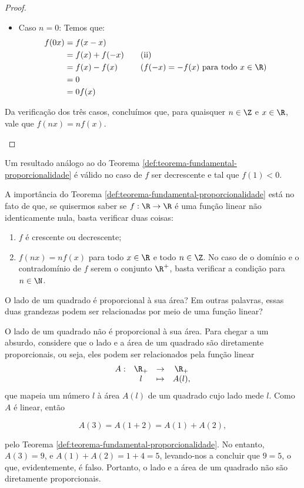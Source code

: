 \begin{proof}
\begin{itemize}
\begin{itemize}
      \item Caso $n=0$: Temos que:
      \begin{alignat*}{3}
        f(0x) &= f(x-x) \\
        &= f(x)+f(-x) && \quad\text{(ii)}\\
        &= f(x)-f(x) && \quad\text{($f(-x) = -f(x)$ para todo $x \in \R$)}\\
        &= 0\\
        &= 0f(x)
      \end{alignat*}
    \end{itemize}

    Da verificação dos três casos, concluímos que, para quaisquer $n\in\Z$ e $x\in\R$, vale que $f(nx)=nf(x)$.
  \end{itemize}
\end{proof}

\begin{remark}
    Um resultado análogo ao do Teorema \ref{def:teorema-fundamental-proporcionalidade} é válido
    no caso de $f$ ser decrescente e tal que $f(1) < 0$.
\end{remark}

A importância do Teorema \ref{def:teorema-fundamental-proporcionalidade} 
está no fato de que, se quisermos saber se $f: \R \to \R$ é uma função linear não identicamente nula,
basta verificar duas coisas:
%
\begin{enumerate}[1.]
  \item $f$ é crescente ou decrescente;
  \item $f(nx) = n f(x)$ para todo $x \in \R$ e todo $n \in \Z$. No
  caso de o domínio e o contradomínio de $f$ serem o conjunto $\R^+$, basta verificar a condição
  para $n \in \N$.
\end{enumerate}

\begin{example}
O lado de um quadrado é proporcional à sua área? Em outras palavras,
essas duas grandezas podem ser relacionadas por meio de uma função
linear?
\end{example}

\begin{solution}
  O lado de um quadrado não é proporcional à sua área.
  Para chegar a um absurdo, 
  considere que o lado e a área de um quadrado são diretamente proporcionais, ou seja, eles podem
  ser relacionados pela função linear
  \begin{equation*}
  \begin{array}{cccc}
    A : & \R_+ & \to     & \R_+ \\
        &  l & \mapsto & A(l),
  \end{array}
  \end{equation*}
  que mapeia um número $l$ à área $A(l)$ de um quadrado cujo lado mede $l$.
  Como $A$ é linear, então

  $$A(3) = A(1+2)=A(1)+A(2),$$

  \noindent pelo Teorema \ref{def:teorema-fundamental-proporcionalidade}. 
  No entanto, $A(3) = 9$, e $A(1)+A(2) = 1+4 = 5$, levando-nos a concluir que $9=5$, o que, evidentemente,
  é falso. Portanto, o lado e a área de um quadrado não são diretamente proporcionais.
\end{solution}